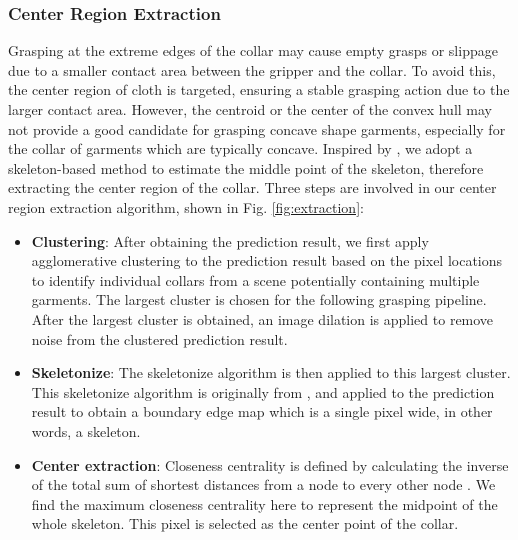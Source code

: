 \documentclass[letterpaper, 10 pt, conference]{ieeeconf}  %
\begin{document}
\subsubsection{Center Region Extraction}
Grasping at the extreme edges of the collar may cause empty grasps or slippage due to a smaller contact area between the gripper and the collar.
To avoid this, the center region of cloth is targeted, ensuring a stable grasping action due to the larger contact area.
However, the centroid or the center of the convex hull may not provide a good candidate for grasping concave shape garments, especially for the collar of garments which are typically concave. Inspired by \cite{jimenez2020perception}, we adopt a skeleton-based method to estimate the middle point of the skeleton, therefore extracting the center region of the collar. Three steps are involved in our center region extraction algorithm, shown in Fig. \ref{fig:extraction}:
\begin{itemize}
\item
\textbf{Clustering}:
After obtaining the prediction result, we first apply agglomerative clustering to the prediction result based on the pixel locations to identify individual collars from a scene potentially containing multiple garments. The largest cluster is chosen for the following grasping pipeline. After the largest cluster is obtained, an image dilation is applied to remove noise from the clustered prediction result.
\end{itemize}

\begin{itemize}
\item
\textbf{Skeletonize}:
The skeletonize algorithm is then applied to this largest cluster. This skeletonize algorithm is originally from \cite{zhang1984fast}, and applied to the prediction result to obtain a boundary edge map which is a single pixel wide, in other words, a skeleton.
\end{itemize}

\begin{itemize}
\item
\textbf{Center extraction}:
Closeness centrality is defined by calculating the inverse of the total sum of shortest distances from a node to every other node \cite{freeman1978centrality}. We find the maximum closeness centrality here to represent the midpoint of the whole skeleton. This pixel is selected as the center point of the collar.
\end{itemize}
\end{document}
